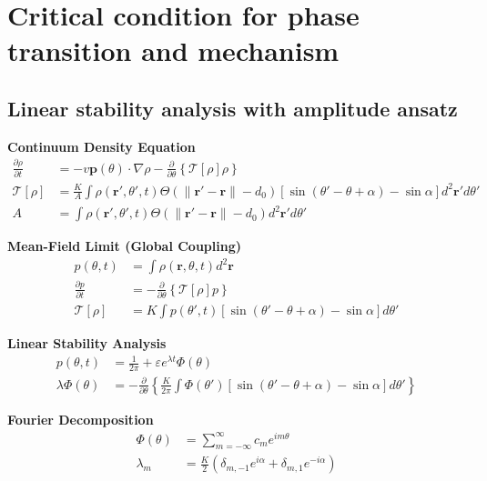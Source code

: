 \documentclass{article}
\begin{document}
\newpage
\section{Critical condition for phase transition and mechanism}

\subsection{Linear stability analysis with amplitude ansatz}

\textbf{Continuum Density Equation}
\begin{align}
\frac{\partial \rho}{\partial t} &= -v\mathbf{p}(\theta)\cdot\nabla\rho - \frac{\partial}{\partial\theta}\left\{\mathcal{T}[\rho]\rho\right\} \\
\mathcal{T}[\rho] &= \frac{K}{A}\int \rho(\mathbf{r}',\theta',t)\Theta(\|\mathbf{r}'-\mathbf{r}\|-d_0)\left[\sin(\theta'-\theta+\alpha) - \sin\alpha\right]d^2\mathbf{r}'d\theta' \\
A &= \int \rho(\mathbf{r}',\theta',t)\Theta(\|\mathbf{r}'-\mathbf{r}\|-d_0)d^2\mathbf{r}'d\theta'
\end{align}

\noindent\textbf{Mean-Field Limit (Global Coupling)}
\begin{align}
p(\theta,t) &= \int \rho(\mathbf{r},\theta,t)d^2\mathbf{r} \\
\frac{\partial p}{\partial t} &= -\frac{\partial}{\partial\theta}\left\{\mathcal{T}[\rho]p\right\} \\
\mathcal{T}[\rho] &= K\int p(\theta',t)\left[\sin(\theta'-\theta+\alpha) - \sin\alpha\right]d\theta'
\end{align}

\noindent\textbf{Linear Stability Analysis}
\begin{align}
p(\theta,t) &= \frac{1}{2\pi} + \varepsilon e^{\lambda t}\Phi(\theta) \\
\lambda\Phi(\theta) &= -\frac{\partial}{\partial\theta}\left\{\frac{K}{2\pi}\int \Phi(\theta')\left[\sin(\theta'-\theta+\alpha) - \sin\alpha\right]d\theta'\right\}
\end{align}

\noindent\textbf{Fourier Decomposition}
\begin{align}
\Phi(\theta) &= \sum_{m=-\infty}^\infty c_m e^{im\theta} \\
\lambda_m &= \frac{K}{2}\left(\delta_{m,-1}e^{i\alpha} + \delta_{m,1}e^{-i\alpha}\right)
\end{align}
\end{document}
